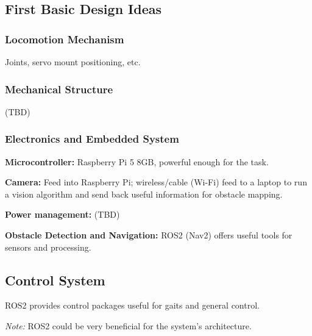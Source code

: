 \documentclass{article}
\begin{document}
\subsection{First Basic Design Ideas}

\subsubsection{Locomotion Mechanism}
Joints, servo mount positioning, etc.

\subsubsection{Mechanical Structure}
(TBD)

\subsubsection{Electronics and Embedded System}

\textbf{Microcontroller:} Raspberry Pi 5 8GB, powerful enough for the task.

\textbf{Camera:} Feed into Raspberry Pi; wireless/cable (Wi-Fi) feed to a laptop to run a vision algorithm and send back useful information for obstacle mapping.

\textbf{Power management:} (TBD)

\textbf{Obstacle Detection and Navigation:} ROS2 (Nav2) offers useful tools for sensors and processing.

\subsection{Control System}
ROS2 provides control packages useful for gaits and general control. 

\textit{Note:} ROS2 could be very beneficial for the system's architecture.
\end{document}
